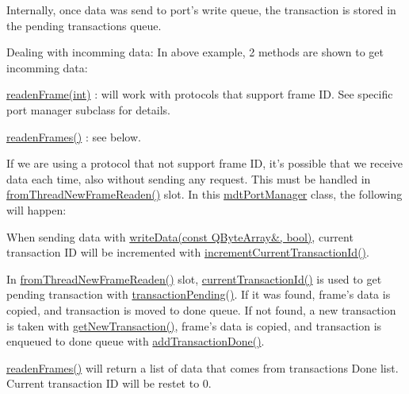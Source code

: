 Internally, once data was send to port's write queue, the transaction is stored in the pending transactions queue.

Dealing with incomming data: In above example, 2 methods are shown to get incomming data:
\begin{DoxyItemize}
\item \hyperlink{classmdt_port_manager_a830ae182d06dd6a52c43a7f45b9240ac}{readenFrame(int)} : will work with protocols that support frame ID. See specific port manager subclass for details.
\item \hyperlink{classmdt_port_manager_addd5dcae9644cea42a9871205af41796}{readenFrames()} : see below.
\end{DoxyItemize}

If we are using a protocol that not support frame ID, it's possible that we receive data each time, also without sending any request. This must be handled in \hyperlink{classmdt_port_manager_a4fcc8f0699b655156e661bb3de6056cc}{fromThreadNewFrameReaden()} slot. In this \hyperlink{classmdt_port_manager}{mdtPortManager} class, the following will happen:
\begin{DoxyItemize}
\item When sending data with \hyperlink{classmdt_port_manager_a9b902a60c8b21585904bcb1d6e604369}{writeData(const QByteArray\&, bool)}, current transaction ID will be incremented with \hyperlink{classmdt_port_manager_a4d009936a0a5130f3bfecb69fee4ce42}{incrementCurrentTransactionId()}.
\item In \hyperlink{classmdt_port_manager_a4fcc8f0699b655156e661bb3de6056cc}{fromThreadNewFrameReaden()} slot, \hyperlink{classmdt_port_manager_a19abf29c8948cde0337d67c9722c25aa}{currentTransactionId()} is used to get pending transaction with \hyperlink{classmdt_port_manager_a18478707a9be7638b06cde48ced48297}{transactionPending()}. If it was found, frame's data is copied, and transaction is moved to done queue. If not found, a new transaction is taken with \hyperlink{classmdt_port_manager_a75ebd3d1859e3ed38b9558981e53aac4}{getNewTransaction()}, frame's data is copied, and transaction is enqueued to done queue with \hyperlink{classmdt_port_manager_a4b584d9005316be9991e6026e4c5e5a4}{addTransactionDone()}.
\item \hyperlink{classmdt_port_manager_addd5dcae9644cea42a9871205af41796}{readenFrames()} will return a list of data that comes from transactions Done list. Current transaction ID will be restet to 0.
\end{DoxyItemize}

